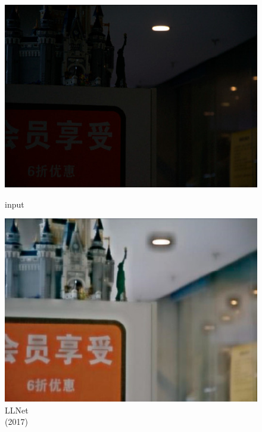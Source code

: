 \documentclass[CJK,aspectratio=169]{beamer}  %
\begin{document}
\begin{frame}
\begin{figure}
\begin{minipage}{.6\columnwidth}
\begin{minipage}{0.18\columnwidth}
				\includegraphics[width=\linewidth]{picture/LLIE/VE-LOL-L/input}
				\captionsetup{justification=centering}
				\caption*{\tiny input \\ \quad }
				\label{fig: input}
			\end{minipage}
			\begin{minipage}{0.18\columnwidth}
				\includegraphics[width=\linewidth]{picture/LLIE/VE-LOL-L/LLNet}
				\captionsetup{justification=centering}
				\caption*{\tiny LLNet \\ (2017)}
				\label{fig: LLNet}	
			\end{minipage}
			\begin{minipage}{0.18\columnwidth}

\end{minipage}
\end{minipage}
\end{figure}
\end{frame}
\end{document}
